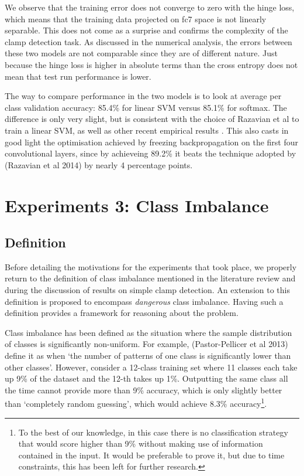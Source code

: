 \documentclass[a4paper,11pt]{article}
\begin{document}
We observe that the training error does not converge to zero with the hinge loss, which means that the training data projected on fc7 space is not linearly separable. This does not come as a surprise and confirms the complexity of the clamp detection task. As discussed in the numerical analysis, the errors between these two models are not comparable since they are of different nature. Just because the hinge loss is higher in absolute terms than the cross entropy does not mean that test run performance is lower. 

The way to compare performance in the two models is to look at average per class validation accuracy: 85.4\% for linear SVM versus 85.1\% for softmax. The difference is only very slight, but is consistent with the choice of Razavian et al to train a linear SVM, as well as other recent empirical results \cite{svm-nn}. This also casts in good light the optimisation achieved by freezing backpropagation on the first four convolutional layers, since by achieveing 89.2\% it beats the technique adopted by (Razavian et al 2014) by nearly 4 percentage points.


\clearpage
\section{Experiments 3: Class Imbalance}

\subsection{Definition}

Before detailing the motivations for the experiments that took place, we properly return to the definition of class imbalance mentioned in the literature review and during the discussion of results on simple clamp detection. An extension to this definition is proposed to encompass \textit{dangerous} class imbalance. Having such a definition provides a framework for reasoning about the problem.

Class imbalance has been defined as the situation where the sample distribution of classes is significantly non-uniform. For example, (Pastor-Pellicer et al 2013) \cite{f-measure} define it as when `the number of patterns of one class is significantly lower than other classes'. However, consider a 12-class training set where 11 classes each take up 9\% of the dataset and the 12-th takes up 1\%. Outputting the same class all the time cannot provide more than 9\% accuracy, which is only slightly better than `completely random guessing', which would achieve 8.3\% accuracy\footnote{To the best of our knowledge, in this case there is no classification strategy that would score higher than 9\% without making use of information contained in the input. It would be preferable to prove it, but due to time constraints, this has been left for further research.}. \\
\end{document}
